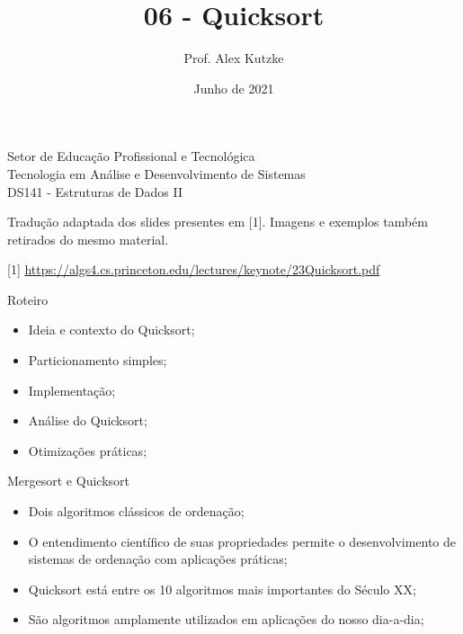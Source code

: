 \documentclass{beamer}
\title{06 - Quicksort}
\author{Prof. Alex Kutzke}
\date{Junho de 2021}
\begin{document}
\begin{frame}
  \begin{center}
    \large{Setor de Educação Profissional e Tecnológica}\\
    Tecnologia em Análise e Desenvolvimento de Sistemas\\
    \vspace{1cm}			
    \small{DS141 - Estruturas de Dados II}
  \end{center}
  \titlepage

  \small{
  \center Tradução adaptada dos slides presentes em [1]. Imagens e exemplos também retirados do mesmo material.

  [1] \url{https://algs4.cs.princeton.edu/lectures/keynote/23Quicksort.pdf}}
\end{frame}

\begin{frame}[c]{Roteiro}
  \begin{itemize}
    \item Ideia e contexto do Quicksort;
    \item Particionamento simples;
    \item Implementação;
    \item Análise do Quicksort;
    \item Otimizações práticas;
  \end{itemize}

\end{frame}

\begin{frame}[c]{Mergesort e Quicksort}
  \begin{itemize}
    \item Dois algoritmos clássicos de ordenação;
    \item O entendimento científico de suas propriedades permite o desenvolvimento de sistemas de ordenação com aplicações práticas;
    \item Quicksort está entre os 10 algoritmos mais importantes do Século XX;
    \item São algoritmos amplamente utilizados em aplicações do nosso dia-a-dia;
  \end{itemize}
\end{frame}
\end{document}

